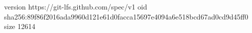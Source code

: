 version https://git-lfs.github.com/spec/v1
oid sha256:89f86f2016ada9960d121e61d0facca15697e4094a6e518bcd67ad0cd9d45ff0
size 12614

